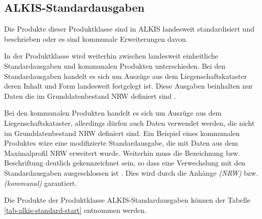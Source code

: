\subsection{ALKIS-Standardausgaben}

Die Produkte dieser Produktklasse sind in \acs{ALKIS} landesweit standardisiert und beschrieben oder es sind kommunale Erweiterungen davon.

In der Produktklasse wird weiterhin zwischen landesweit einheitliche Standardausgaben und kommunalen Produkten unterschieden. Bei den Standardausgaben handelt es sich um Auszüge aus dem Liegenschaftskataster deren Inhalt und Form landesweit festgelegt ist. Diese Ausgaben beinhalten nur Daten die im Grunddatenbestand NRW definiert sind \autocite[vgl.][8]{bezk-grunddaten}.

Bei den kommunalen Produkten handelt es sich um Auszüge aus dem Liegenschaftskataster, allerdings dürfen auch Daten verwendet werden, die nicht im Grunddatenbestand NRW definiert sind. Ein Beispiel eines kommunalen Produktes wäre eine modifizierte Standardausgabe, die mit Daten aus dem Maximalprofil NRW erweitert wurde. Weiterhin muss die Bezeichnung bzw. Beschriftung deutlich gekennzeichnet sein, so dass eine Verwechslung mit den Standardausgaben ausgeschlossen ist \autocite[vgl.][9]{bezk-grunddaten}. Dies wird durch die Anhänge \textit{(NRW)} bzw. \textit{(kommunal)} garantiert.

Die Produkte der Produktklasse ALKIS-Standardausgaben können der Tabelle \ref{tab-alkis-standard-start}  entnommen werden.

